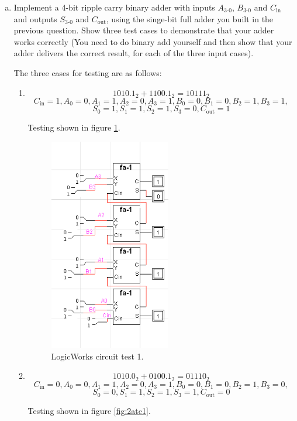 \documentclass[11pt]{article}
\begin{document}
\begin{enumerate}[(a)]
	\item{
		Implement a 4-bit ripple carry binary adder with inputs $A_{3\text{-}0}$, $B_{3\text{-}0}$ and $C_{\text{in}}$ and outputs $S_{3\text{-}0}$ and $C_{\text{out}}$, using the singe-bit full adder you built in the previous question. Show three test cases to demonstrate that your adder works correctly (You need to do binary add yourself and then show that your adder delivers the correct result, for each of the three input cases).

		The three cases for testing are as follows:
		\begin{enumerate}[1.]
			\item{
				\[
					1010.1_2 + 1100.1_2 = 10111_2
				\]
				\[
					C_{\text{in}} = 1,
					A_0 = 0, A_1 = 1, A_2 = 0, A_3 = 1,
					B_0 = 0, B_1 = 0, B_2 = 1, B_3 = 1,
				\]
				\[
					S_0 = 1, S_1 = 1, S_2 = 1, S_3 = 0, C_{\text{out}} = 1
				\]

				Testing shown in figure \ref{fig:2atc}.

				\begin{figure}[h]
					\centering
					\includegraphics[width=150pt]{2at1}
					\caption{\label{fig:2atc} LogicWorks circuit test 1.}
				\end{figure}
			}
			\item{
				\[
					1010.0_2 + 0100.1_2 = 01110_2
				\]
				\[
					C_{\text{in}} = 0,
					A_0 = 0, A_1 = 1, A_2 = 0, A_3 = 1,
					B_0 = 0, B_1 = 0, B_2 = 1, B_3 = 0,
				\]
				\[
					S_0 = 0, S_1 = 1, S_2 = 1, S_3 = 1, C_{\text{out}} = 0
				\]

				Testing shown in figure \ref{fig:2atc1}.

}
\end{enumerate}}
\end{enumerate}
\end{document}
